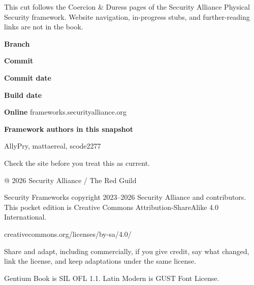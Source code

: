 \clearpage
{}
\begingroup
\setlength{\parskip}{0.85mm}
\fontsize{8}{10}\selectfont
{}

This cut follows the Coercion \& Duress pages of the
Security Alliance Physical Security framework. Website
navigation, in-progress stubs, and further-reading links
are not in the book.

\vspace{1mm}
\textbf{Branch} \quad \texttt{\SourceRef}

\textbf{Commit} \quad \SourceCommit

\textbf{Commit date} \quad \SourceCommitDate

\textbf{Build date} \quad \BuildDate

\textbf{Online} \quad frameworks.securityalliance.org

\textbf{Framework authors in this snapshot}

AllyPry, mattaereal, scode2277

\vspace{0.4mm}
Check the site before you treat this as current.
\endgroup

\clearpage
{}
\begingroup
\setlength{\parskip}{1.1mm}
\vspace*{2mm}
{\fontsize{9}{11}\selectfont @ 2026 Security Alliance / The Red Guild\par}
\vspace{2.5mm}
\fontsize{8}{10}\selectfont

Security Frameworks copyright 2023--2026 Security
Alliance and contributors. This pocket edition is
Creative Commons Attribution-ShareAlike 4.0
International.

creativecommons.org/licenses/by-sa/4.0/

Share and adapt, including commercially, if you give
credit, say what changed, link the license, and keep
adaptations under the same license.

Gentium Book is SIL OFL 1.1. Latin Modern is GUST Font
License.

\clearpage
\endgroup

